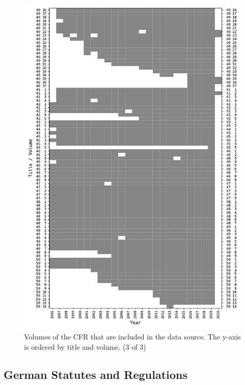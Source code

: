 \documentclass[utf8,sort&compress,numbers,square,table,hidelinks]{frontiers_suppmat} %
\begin{document}
\begin{figure}
	\centering
	\includegraphics[height=0.9\textheight]{figure_si_cfr_inputs-2}
	\caption{Volumes of the CFR that are included in the data source. The y-axis is ordered by title and volume. (3 of 3)}\label{fig:missing-cfr-volumes-3}
\end{figure}

\vspace*{6pt}
\subsection{German Statutes and Regulations}
\end{document}
